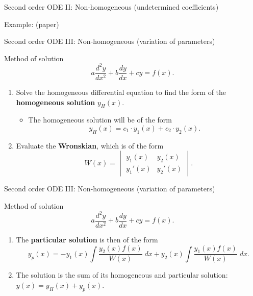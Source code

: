 \begin{frame}{Second order ODE II: Non-homogeneous (undetermined coefficients)}
    \begin{exampleblock}{Example: (paper)}
    \end{exampleblock}
\end{frame}

\begin{frame}{Second order ODE III: Non-homogeneous (variation of parameters)}
    \begin{block}{Method of solution}
        \[ a \frac{d^2y}{dx^2} + b \frac{dy}{dx} + cy = f(x).\]
        \pause
        
        \begin{enumerate}
            \item Solve the homogeneous differential equation to find the form of the \textbf{homogeneous solution} \(y_H(x)\). \pause
            \begin{itemize}
                \item The homogeneous solution will be of the form \[ y_H(x) = c_1 \cdot y_1(x) + c_2 \cdot y_2(x).\] \pause
            \end{itemize}
            
            \item Evaluate the \textbf{Wronskian}, which is of the form \[ W(x) = \begin{vmatrix}y_1(x) & y_2(x) \\ y_1'(x) & y_2'(x)\end{vmatrix}.\]
            \seti
        \end{enumerate}
    \end{block}
\end{frame}

\begin{frame}{Second order ODE III: Non-homogeneous (variation of parameters)}
    \begin{block}{Method of solution}
        \[ a \frac{d^2y}{dx^2} + b \frac{dy}{dx} + cy = f(x).\]
        \pause
        
        \begin{enumerate}
            \conti
            \item The \textbf{particular solution} is then of the form \[ y_p(x) = -y_1(x) \int \frac{y_2(x) f(x)}{W(x)}\;dx + y_2(x) \int \frac{y_1(x) f(x)}{W(x)}\;dx.\] \pause
            
            \item The solution is the sum of its homogeneous and particular solution: \(\displaystyle y(x) = y_H(x) + y_p(x)\).
        \end{enumerate}
    \end{block}
\end{frame}

